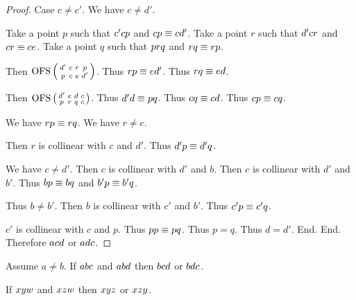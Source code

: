 \documentclass[10pt,a4paper,parskip=half,numbers=endperiod,parskip]{scrartcl}
\begin{document}
\begin{forthel}
\begin{proof}
        Case $c \neq c'$.
          We have $c\neq d'$.

          Take a point $p$ such that
            $c' c p$ and $c p \equiv c d'$.
          Take a point $r$ such that
            $d' c r$ and $c r \equiv c e$.
          Take a point $q$ such that
            $p r q$ and $r q \equiv r p$.

          Then $\operatorname{OFS} \left( \begin{smallmatrix} d' & c & r & p \\ p & c & e & d' \end{smallmatrix} \right)$.
          Thus $r p \equiv e d'$.
          Thus $r q \equiv e d$.

          Then $\operatorname{OFS} \left( \begin{smallmatrix} d' & e & d & c \\ p & r & q & c \end{smallmatrix} \right)$.
          Thus $d' d \equiv p q$.
          Thus $c q \equiv c d$.
          Thus $c p \equiv c q$.

          We have $r p \equiv r q$.
          We have $r \neq c$.

          Then $r$ is collinear with $c$ and $d'$.
          Thus $d' p \equiv d' q$.

          We have $c \neq d'$.
          Then $c$ is collinear with $d'$ and $b$.
          Then $c$ is collinear with $d'$ and $b'$.
          Thus $b p \equiv b q$ and $b' p \equiv b' q$.

          Thus $b \neq b'$.
          Then $b$ is collinear with $c'$ and $b'$.
          Thus $c' p \equiv c' q$.

          $c'$ is collinear with $c$ and $p$.
          Thus $p p \equiv p q$.
          Thus $p = q$.
          Thus $d = d'$.
        End.
      End.
      Therefore $a c d$ or $a d c$. %
    \end{proof}
  \end{forthel}

  \begin{forthel}
    \begin{lemma} %
      Assume $a \neq b$.
      If $a b c$ and $a b d$
      then $b c d$ or $b d c$.
    \end{lemma}

    \begin{theorem} %
      If $x y w$ and $x z w$ then $x y z$ or $x z y$.
    \end{theorem}
  \end{forthel}

\end{document}
